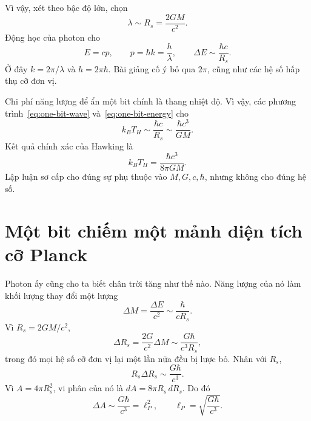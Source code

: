 Vì vậy, xét theo bậc độ lớn, chọn
\begin{equation}
\lambda\sim R_s=\frac{2GM}{c^2}.
\label{eq:one-bit-wave}
\end{equation}
Động học của photon cho
\begin{equation}
E=cp,
\qquad
p=\hbar k=\frac{h}{\lambda},
\qquad
\Delta E\sim\frac{\hbar c}{R_s}.
\label{eq:one-bit-energy}
\end{equation}
Ở đây \(k=2\pi/\lambda\) và \(h=2\pi\hbar\). Bài giảng cố ý bỏ qua \(2\pi\), cũng như các hệ số hấp thụ cỡ đơn vị.

\begin{classroomqa}
\end{classroomqa}

Chi phí năng lượng để ẩn một bit chính là thang nhiệt độ. Vì vậy, các phương trình~\eqref{eq:one-bit-wave} và~\eqref{eq:one-bit-energy} cho
\begin{equation}
k_BT_H\sim\frac{\hbar c}{R_s}
\sim\frac{\hbar c^3}{GM}.
\end{equation}
Kết quả chính xác của Hawking là
\begin{equation}
k_BT_H=\frac{\hbar c^3}{8\pi GM}.
\end{equation}
Lập luận sơ cấp cho đúng sự phụ thuộc vào \(M,G,c,\hbar\), nhưng không cho đúng hệ số.

\section{Một bit chiếm một mảnh diện tích cỡ Planck}

Photon ấy cũng cho ta biết chân trời tăng như thế nào. Năng lượng của nó làm khối lượng thay đổi một lượng
\begin{equation}
\Delta M=\frac{\Delta E}{c^2}
\sim\frac{\hbar}{cR_s}.
\end{equation}
Vì \(R_s=2GM/c^2\),
\begin{equation}
\Delta R_s=\frac{2G}{c^2}\Delta M
\sim\frac{G\hbar}{c^3R_s},
\end{equation}
trong đó mọi hệ số cỡ đơn vị lại một lần nữa đều bị lược bỏ. Nhân với \(R_s\),
\begin{equation}
R_s\Delta R_s\sim\frac{G\hbar}{c^3}.
\end{equation}
Vì \(A=4\pi R_s^2\), vi phân của nó là \(dA=8\pi R_s\,dR_s\). Do đó
\begin{equation}
\Delta A\sim\frac{G\hbar}{c^3}=\ell_P^2,
\qquad
\ell_P=\sqrt{\frac{G\hbar}{c^3}}.
\label{eq:planck-patch}
\end{equation}

